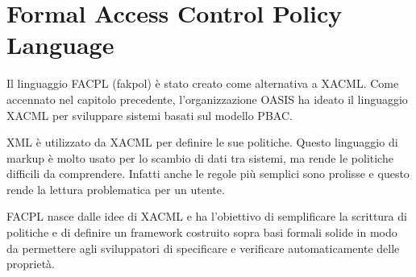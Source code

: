 \chapter{Formal Access Control Policy Language }
\label{chap:Formal Access Control Policy Language}
Il linguaggio FACPL (fakpol)%
 è stato creato come alternativa a XACML. Come accennato nel capitolo precedente,
l'organizzazione OASIS ha ideato il linguaggio XACML per sviluppare sistemi basati sul modello PBAC.\par
XML è utilizzato da XACML per definire le sue politiche. Questo linguaggio di markup è molto usato per lo scambio
di dati tra sistemi, ma rende le politiche difficili da comprendere. Infatti anche le regole più semplici sono prolisse
e questo rende la lettura problematica per un utente.\par
FACPL nasce dalle idee di XACML e ha l'obiettivo di semplificare la scrittura di politiche e di definire un framework
costruito sopra basi formali solide in modo da permettere agli sviluppatori di specificare e verificare automaticamente
delle proprietà.

